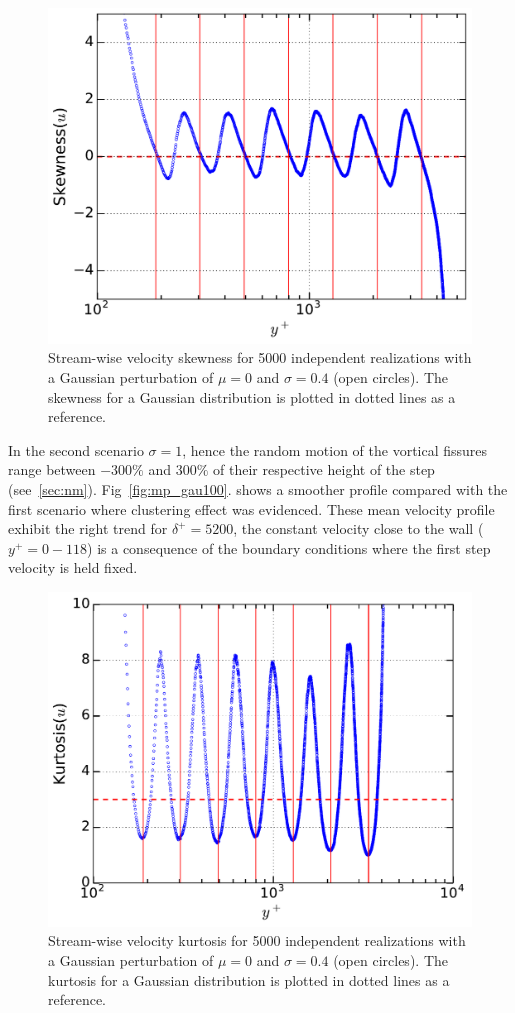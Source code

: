 \documentclass[aps,reprint,amsmath,amssymb,pra]{revtex4-1}%
\begin{document}
\begin{figure}[tb]
\includegraphics[scale=0.46]{figures/skewness_5000_assembles}
\caption{\label{fig:skewgaus} Stream-wise velocity skewness for 5000 independent realizations with a Gaussian perturbation of $\mu=0$ and $\sigma=0.4$ (open circles). The skewness for a Gaussian distribution is plotted in dotted lines as a reference.}
\end{figure}
In the second scenario $\sigma=1$, hence the random motion of the vortical fissures range between $-300\%$ and $300\%$ of their respective height of the step (see~\ref{sec:nm}). Fig~\ref{fig:mp_gau100}. shows a smoother profile compared with the first scenario where clustering effect was evidenced. These mean velocity profile exhibit the right trend for $\delta^+=5200$, the constant velocity close to the wall ($y^+=0-118$) is a consequence of the boundary conditions where the first step velocity is held fixed.
\begin{figure}[tb]
\includegraphics[scale=0.46]{figures/kurtosis_5000_assembles}
\caption{\label{fig:kurt} Stream-wise velocity kurtosis for 5000 independent realizations with a Gaussian perturbation of $\mu=0$ and $\sigma=0.4$ (open circles). The kurtosis for a Gaussian distribution is plotted in dotted lines as a reference.}
\end{figure}
\end{document}
